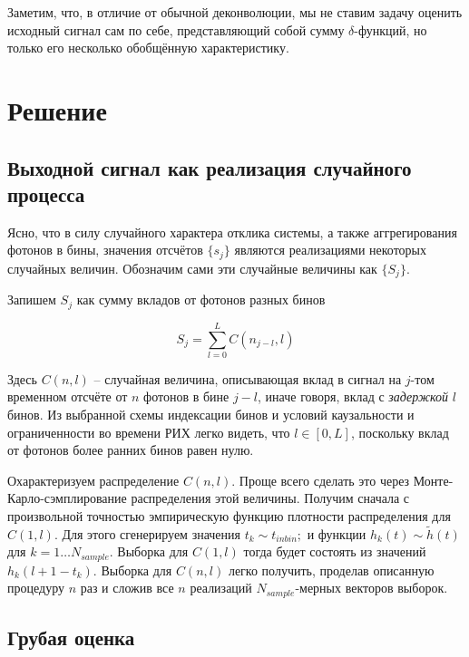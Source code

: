 \documentclass[12pt]{book}
\begin{document}
	Заметим, что, в отличие от обычной деконволюции, мы не ставим задачу оценить исходный сигнал сам по себе, представляющий собой сумму $\delta$-функций, но только его несколько обобщённую характеристику.

	\section{Решение}

	\subsection{Выходной сигнал как реализация случайного процесса}
	
	Ясно, что в силу случайного характера отклика системы, а также аггрегирования фотонов в бины, значения отсчётов $\{ s_j \}$ являются реализациями некоторых случайных величин. Обозначим сами эти случайные величины как $\{ S_j \}$.

	Запишем $S_j$ как сумму вкладов от фотонов разных бинов
	
	\begin{equation}
		S_j = \sum_{l=0}^{L} C(n_{j-l}, l)
		\label{eq:S-definition-as-random-variable}
	\end{equation}

	Здесь $C(n, l)$ -- случайная величина, описывающая вклад в сигнал на $j$-том временном отсчёте от $n$ фотонов в бине $j - l$, иначе говоря, вклад с \textit{задержкой} $l$ бинов. Из выбранной схемы индексации бинов и условий каузальности и ограниченности во времени РИХ легко видеть, что $l \in \left[0, L\right]$, поскольку вклад от фотонов более ранних бинов равен нулю.
	
	Охарактеризуем распределение $C(n, l)$. Проще всего сделать это через Монте-Карло-сэмплирование распределения этой величины. Получим сначала с произвольной точностью эмпирическую функцию плотности распределения для $C(1, l)$. Для этого сгенерируем значения $t_k \sim t_{inbin};$ и функции $h_k(t) \sim \tilde{h}(t)$ для $k = 1 \ldots N_{sample}$. Выборка для $C(1, l)$ тогда будет состоять из значений $h_k(l + 1 - t_k)$. Выборка для $C(n, l)$ легко получить, проделав описанную процедуру $n$ раз и сложив все $n$ реализаций $N_{sample}$-мерных векторов выборок.

	\subsection{Грубая оценка}
	\label{sec:mean-estimation}
	
\end{document}
